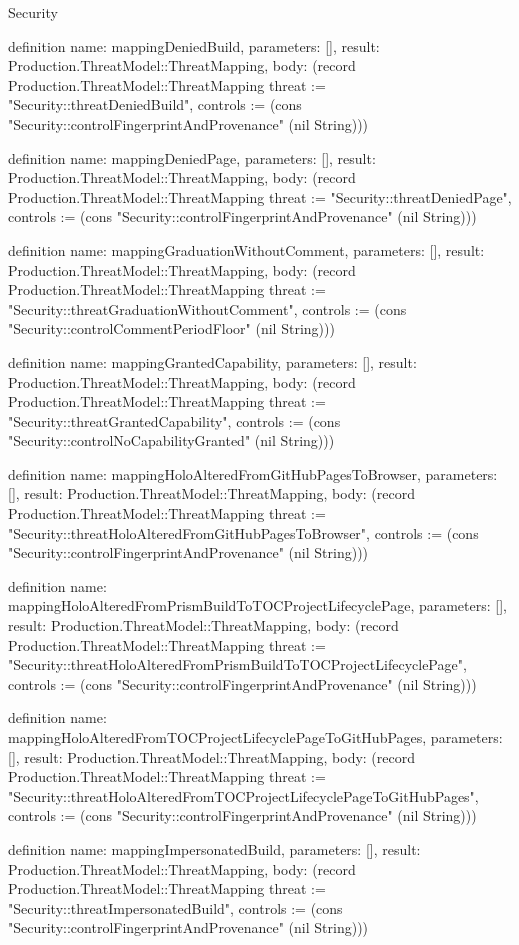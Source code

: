 \begin{lexlean}{Security}
\begin{semanticmodule}
definition{
  name: mappingDeniedBuild,
  parameters: [],
  result: Production.ThreatModel::ThreatMapping,
  body: (record Production.ThreatModel::ThreatMapping {threat := "Security::threatDeniedBuild", controls := (cons "Security::controlFingerprintAndProvenance" (nil String))})
}

definition{
  name: mappingDeniedPage,
  parameters: [],
  result: Production.ThreatModel::ThreatMapping,
  body: (record Production.ThreatModel::ThreatMapping {threat := "Security::threatDeniedPage", controls := (cons "Security::controlFingerprintAndProvenance" (nil String))})
}

definition{
  name: mappingGraduationWithoutComment,
  parameters: [],
  result: Production.ThreatModel::ThreatMapping,
  body: (record Production.ThreatModel::ThreatMapping {threat := "Security::threatGraduationWithoutComment", controls := (cons "Security::controlCommentPeriodFloor" (nil String))})
}

definition{
  name: mappingGrantedCapability,
  parameters: [],
  result: Production.ThreatModel::ThreatMapping,
  body: (record Production.ThreatModel::ThreatMapping {threat := "Security::threatGrantedCapability", controls := (cons "Security::controlNoCapabilityGranted" (nil String))})
}

definition{
  name: mappingHoloAlteredFromGitHubPagesToBrowser,
  parameters: [],
  result: Production.ThreatModel::ThreatMapping,
  body: (record Production.ThreatModel::ThreatMapping {threat := "Security::threatHoloAlteredFromGitHubPagesToBrowser", controls := (cons "Security::controlFingerprintAndProvenance" (nil String))})
}

definition{
  name: mappingHoloAlteredFromPrismBuildToTOCProjectLifecyclePage,
  parameters: [],
  result: Production.ThreatModel::ThreatMapping,
  body: (record Production.ThreatModel::ThreatMapping {threat := "Security::threatHoloAlteredFromPrismBuildToTOCProjectLifecyclePage", controls := (cons "Security::controlFingerprintAndProvenance" (nil String))})
}

definition{
  name: mappingHoloAlteredFromTOCProjectLifecyclePageToGitHubPages,
  parameters: [],
  result: Production.ThreatModel::ThreatMapping,
  body: (record Production.ThreatModel::ThreatMapping {threat := "Security::threatHoloAlteredFromTOCProjectLifecyclePageToGitHubPages", controls := (cons "Security::controlFingerprintAndProvenance" (nil String))})
}

definition{
  name: mappingImpersonatedBuild,
  parameters: [],
  result: Production.ThreatModel::ThreatMapping,
  body: (record Production.ThreatModel::ThreatMapping {threat := "Security::threatImpersonatedBuild", controls := (cons "Security::controlFingerprintAndProvenance" (nil String))})
}


\end{semanticmodule}
\end{lexlean}
